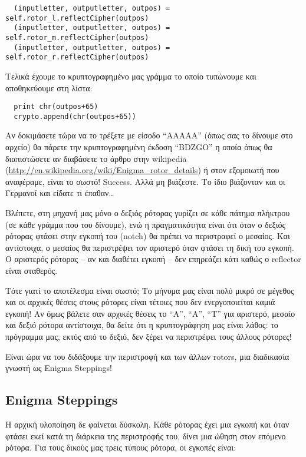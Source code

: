 \documentclass[a4paper,twoside,12pt]{article}
\begin{document}
\begin{verbatim}
  (inputletter, outputletter, outpos) = self.rotor_l.reflectCipher(outpos)
  (inputletter, outputletter, outpos) = self.rotor_m.reflectCipher(outpos)
  (inputletter, outputletter, outpos) = self.rotor_r.reflectCipher(outpos)
\end{verbatim}

Τελικά έχουμε το κρυπτογραφημένο μας γράμμα το οποίο τυπώνουμε και αποθηκεύουμε στη λίστα:

\begin{verbatim}
  print chr(outpos+65)
  crypto.append(chr(outpos+65))
\end{verbatim}

Αν δοκιμάσετε τώρα να το τρέξετε με είσοδο “ΑΑΑΑΑ” (όπως σας το δίνουμε στο αρχείο) θα πάρετε την κρυπτογραφημένη έκδοση “BDZGO” η οποία όπως θα διαπιστώσετε αν διαβάσετε το άρθρο στην wikipedia (\url{http://en.wikipedia.org/wiki/Enigma_rotor_details}) ή στον εξομοιωτή που αναφέραμε, είναι το σωστό! Success. Αλλά μη βιάζεστε. Το ίδιο βιάζονταν και οι Γερμανοί και είδατε τι έπαθαν\ldots

Βλέπετε, στη μηχανή μας μόνο ο δεξιός ρότορας γυρίζει σε κάθε πάτημα πλήκτρου (σε κάθε γράμμα που του δίνουμε), ενώ η πραγματικότητα είναι ότι όταν ο δεξιός ρότορας φτάσει στην εγκοπή του (notch) θα πρέπει να περιστραφεί ο μεσαίος. Και αντίστοιχα, ο μεσαίος θα περιστρέψει τον αριστερό όταν φτάσει τη δική του εγκοπή. Ο αριστερός ρότορας – αν και διαθέτει εγκοπή – δεν επηρεάζει κάτι καθώς ο reflector είναι σταθερός.

Τότε γιατί το αποτέλεσμα είναι σωστό; Το μήνυμα μας είναι πολύ μικρό σε μέγεθος και οι αρχικές θέσεις στους ρότορες είναι τέτοιες που δεν ενεργοποιείται καμιά εγκοπή! Αν όμως βάλετε σαν αρχικές θέσεις το “Α”, “Α”, “Τ” για αριστερό, μεσαίο και δεξιό ρότορα αντίστοιχα, θα δείτε ότι η κρυπτογράφηση μας είναι λάθος: το πρόγραμμα μας, εκτός από το δεξιό, δεν ξέρει να περιστρέφει τους άλλους ρότορες!

Είναι ώρα να του διδάξουμε την περιστροφή και των άλλων rotors, μια διαδικασία γνωστή ως Enigma Steppings!

\subsection{Enigma Steppings}

Η αρχική υλοποίηση δε φαίνεται δύσκολη. Κάθε ρότορας έχει μια εγκοπή και όταν φτάσει εκεί κατά τη διάρκεια της περιστροφής του, δίνει μια ώθηση στον επόμενο ρότορα. Για τους δικούς μας τρεις τύπους ρότορα, οι εγκοπές είναι:
\end{document}
